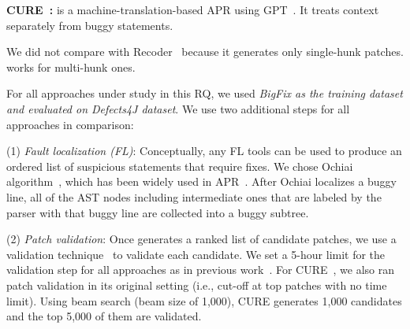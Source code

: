 
{\bf CURE~\cite{cure-icse21}: } is a machine-translation-based APR
using GPT~\cite{radford2018improving}.
It treats context separately from buggy statements.




We did not compare with Recoder~\cite{recoder-fse21} because it
generates only single-hunk patches. {\tool} works for multi-hunk ones.



For all approaches under study in this RQ, we used {\em BigFix as the
training dataset and evaluated on Defects4J dataset}. 
We use two additional steps for all approaches in comparison:

(1) {\em Fault localization (FL)}: Conceptually, any FL
tools can be used to produce an ordered list of suspicious
statements that require fixes. We chose Ochiai
algorithm~\cite{abreu2006evaluation, pearson2017evaluating}, which has
been widely used in
APR~\cite{jiang2018shaping,xiong2017precise,koyuncu2018fixminer,xin2017leveraging,wen2018context,liu2018lsrepair}.
After Ochiai localizes a buggy line, all of the AST nodes including
intermediate ones that are labeled by the parser with that buggy line
are collected into a buggy subtree.

(2) {\em Patch validation}: Once {\tool} generates a ranked list of
candidate patches, we use a validation
technique~\cite{saha2017elixir,jiang2018shaping} to validate each
candidate.
We set a 5-hour limit for the validation step for all approaches as in
previous work~\cite{icse20,tbar-issta19}.
For CURE~\cite{cure-icse21}, we also ran patch validation in its
original setting (i.e., cut-off at top patches with no time
limit). Using beam search (beam size of 1,000), CURE generates 1,000
candidates and the top 5,000 of them are validated.

